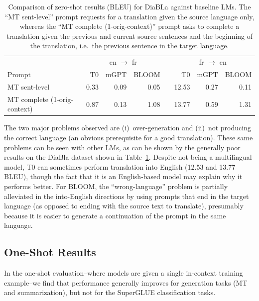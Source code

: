 \begin{table}[ht!]
    \centering\small
    \begin{tabular}{lrrrcrrr}
    \toprule
    & \multicolumn{3}{c}{en $\rightarrow$ fr } & \hphantom{woo} & \multicolumn{3}{c}{fr $\rightarrow$ en } \\
    Prompt & T0 & mGPT & BLOOM && T0 & mGPT & BLOOM  \\ 
    \midrule
    MT sent-level       & 0.33 & 0.09 & 0.05 && 12.53 & 0.27 & 0.11 \\
    MT complete (1-orig-context) & 0.87 & 0.13 & 1.08 && 13.77 & 0.59 & 1.31 \\ 
    \bottomrule
    \end{tabular}
    \caption{Comparison of zero-shot results (BLEU) for DiaBLa against baseline LMs. The ``MT sent-level'' prompt requests for a translation given the source language only, whereas the ``MT complete (1-orig-context)'' prompt asks to complete a translation given the previous and current source sentences and the beginning of the translation, i.e.~the previous sentence in the target language.}
    \label{tab:mt-diabla-zero-shot-compare-baselines}
\end{table}

The two major problems observed are (i)~over-generation and (ii)~not producing the correct language (an obvious prerequisite for a good translation). These same problems can be seen with other LMs, as can be shown by the generally poor results on the DiaBla dataset shown in Table~\ref{tab:mt-diabla-zero-shot-compare-baselines}.
Despite not being a multilingual model, T0 \citep{sanh2022multitask} can sometimes perform translation into English (12.53 and 13.77 BLEU), though the fact that it is an English-based model may explain why it performs better. For BLOOM, the ``wrong-language'' problem is partially alleviated in the into-English directions by using prompts that end in the target language (as opposed to ending with the source text to translate), presumably because it is easier to generate a continuation of the prompt in the same language.

\subsection{One-Shot Results}
\label{sec:eval:oneshot}

In the one-shot evaluation--where models are given a single in-context training example--we find that performance generally improves for generation tasks (MT and summarization), but not for the SuperGLUE classification tasks.


